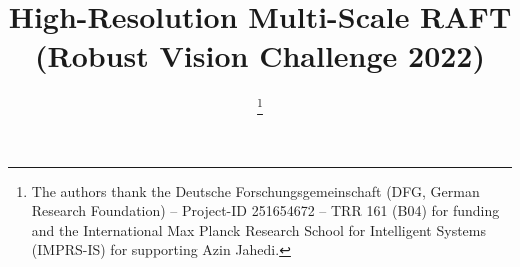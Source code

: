 \documentclass[conference,compsoc,a4paper]{IEEEtran}[2015/08/26]
\begin{document}
\title{High-Resolution Multi-Scale RAFT \\ (Robust Vision Challenge 2022)}

\author{

   
   \thanks{The authors thank the Deutsche Forschungsgemeinschaft (DFG, German Research Foundation) -- Project-ID 251654672 -- TRR 161 (B04) for funding and the International Max Planck Research School for Intelligent Systems (IMPRS-IS) for supporting Azin Jahedi.}
}




\maketitle

\thispagestyle{plain}
\pagestyle{plain}

\iffalse
  \IEEEoverridecommandlockouts
  \IEEEpubid{\begin{minipage}{\textwidth}\ \\[12pt] \centering
      1551-3203 \copyright 2015 IEEE.
      Personal use is permitted, but republication/redistribution requires IEEE permission.
      \\
      See \url{https://www.ieee.org/publications_standards/publications/rights/index.html} for more information.
    \end{minipage}}
\fi
\end{document}
